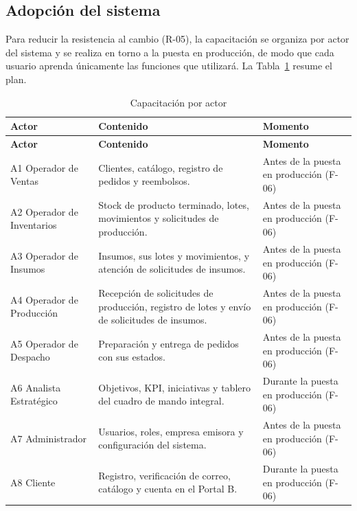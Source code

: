 \subsection{Adopción del sistema}


Para reducir la resistencia al cambio (R-05), la capacitación se organiza por actor del sistema y se realiza en torno a la puesta en producción, de modo que cada usuario aprenda únicamente las funciones que utilizará. La Tabla~\ref{tab:cap4-7} resume el plan.


{\small
\renewcommand{\arraystretch}{1.3}
\begin{longtable}{|>{\raggedright\arraybackslash}p{3.12cm}|>{\raggedright\arraybackslash}p{7.20cm}|>{\raggedright\arraybackslash}p{4.68cm}|}
\caption{Capacitación por actor}\label{tab:cap4-7}\\
\hline
\textbf{Actor} & \textbf{Contenido} & \textbf{Momento} \\
\hline
\endfirsthead
\hline
\textbf{Actor} & \textbf{Contenido} & \textbf{Momento} \\
\hline
\endhead
A1 Operador de Ventas & Clientes, catálogo, registro de pedidos y reembolsos. & Antes de la puesta en producción (F-06) \\
\hline
A2 Operador de Inventarios & Stock de producto terminado, lotes, movimientos y solicitudes de producción. & Antes de la puesta en producción (F-06) \\
\hline
A3 Operador de Insumos & Insumos, sus lotes y movimientos, y atención de solicitudes de insumos. & Antes de la puesta en producción (F-06) \\
\hline
A4 Operador de Producción & Recepción de solicitudes de producción, registro de lotes y envío de solicitudes de insumos. & Antes de la puesta en producción (F-06) \\
\hline
A5 Operador de Despacho & Preparación y entrega de pedidos con sus estados. & Antes de la puesta en producción (F-06) \\
\hline
A6 Analista Estratégico & Objetivos, KPI, iniciativas y tablero del cuadro de mando integral. & Durante la puesta en producción (F-06) \\
\hline
A7 Administrador & Usuarios, roles, empresa emisora y configuración del sistema. & Antes de la puesta en producción (F-06) \\
\hline
A8 Cliente & Registro, verificación de correo, catálogo y cuenta en el Portal B. & Durante la puesta en producción (F-06) \\
\hline
\end{longtable}
}


